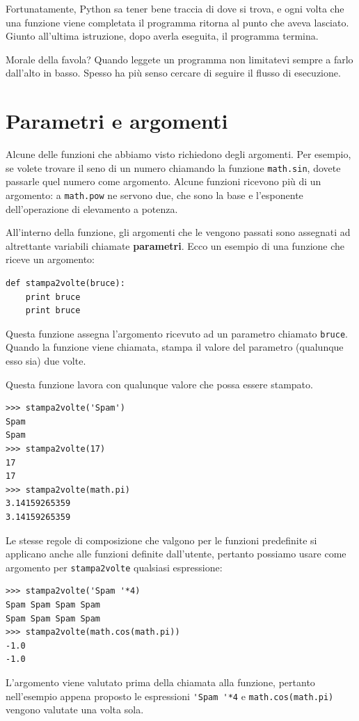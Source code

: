 \documentclass[10pt]{book}
\begin{document}
Fortunatamente, Python sa tener bene traccia di dove si trova, e ogni volta che una funzione viene completata il programma ritorna al punto che aveva lasciato. Giunto all'ultima istruzione, dopo averla eseguita, il programma termina.

Morale della favola? Quando leggete un programma non limitatevi sempre a farlo dall'alto in basso. Spesso ha più senso cercare di seguire il flusso di esecuzione.


\section{Parametri e argomenti}
\label{parametri}

Alcune delle funzioni che abbiamo visto richiedono degli argomenti. Per esempio, se volete trovare il seno di un numero chiamando la funzione {\tt math.sin}, dovete passarle quel numero come argomento. Alcune funzioni ricevono più di un argomento: a {\tt math.pow} ne servono due, che sono la base e l'esponente dell'operazione di elevamento a potenza. 

All'interno della funzione, gli argomenti che le vengono passati sono assegnati ad altrettante variabili chiamate {\bf parametri}. Ecco un esempio di una funzione che riceve un argomento:

\begin{verbatim}
def stampa2volte(bruce):
    print bruce
    print bruce
\end{verbatim}
%
Questa funzione assegna l'argomento ricevuto ad un parametro chiamato {\tt bruce}. Quando la funzione viene chiamata, stampa il valore del parametro (qualunque esso sia) due volte.

Questa funzione lavora con qualunque valore che possa essere stampato.

\begin{verbatim}
>>> stampa2volte('Spam')
Spam
Spam
>>> stampa2volte(17)
17
17
>>> stampa2volte(math.pi)
3.14159265359
3.14159265359
\end{verbatim}
%
Le stesse regole di composizione che valgono per le funzioni predefinite si applicano anche alle funzioni definite dall'utente, pertanto possiamo usare come argomento per \verb"stampa2volte" qualsiasi espressione:

\begin{verbatim}
>>> stampa2volte('Spam '*4)
Spam Spam Spam Spam
Spam Spam Spam Spam
>>> stampa2volte(math.cos(math.pi))
-1.0
-1.0
\end{verbatim}
%
L'argomento viene valutato prima della chiamata alla funzione, pertanto nell'esempio appena proposto le espressioni \verb"'Spam '*4" e
{\tt math.cos(math.pi)} vengono valutate una volta sola.
\end{document}
